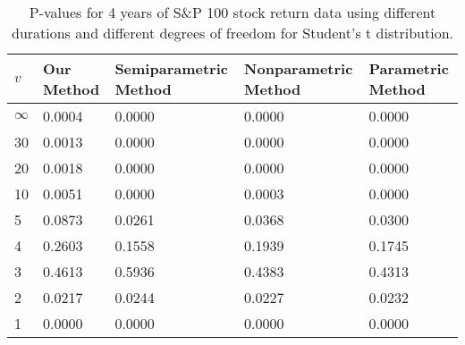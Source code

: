 \begin{table}[ht]
\centering
\caption{P-values for 4 years of S\&P 100 stock return 
                   data using different durations
  and different degrees of freedom for Student's t distribution.} 
\label{table:SP1004}
\begin{tabular}{lllll}
  \hline
$v$ & Our Method & Semiparametric Method & Nonparametric Method & Parametric Method \\ 
  \hline
$\infty$ & 0.0004 & 0.0000 & 0.0000 & 0.0000 \\ 
  30 & 0.0013 & 0.0000 & 0.0000 & 0.0000 \\ 
  20 & 0.0018 & 0.0000 & 0.0000 & 0.0000 \\ 
  10 & 0.0051 & 0.0000 & 0.0003 & 0.0000 \\ 
  5 & 0.0873 & 0.0261 & 0.0368 & 0.0300 \\ 
  4 & 0.2603 & 0.1558 & 0.1939 & 0.1745 \\ 
  3 & 0.4613 & 0.5936 & 0.4383 & 0.4313 \\ 
  2 & 0.0217 & 0.0244 & 0.0227 & 0.0232 \\ 
  1 & 0.0000 & 0.0000 & 0.0000 & 0.0000 \\ 
   \hline
\end{tabular}
\end{table}

